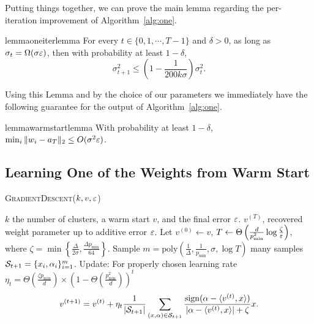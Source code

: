 Putting things together, we can prove the main lemma regarding the per-iteration improvement of Algorithm~\ref{alg:one}.

\begin{restatable}{lemma}{oneiterlemma} \label{lem:one_iter}
For every $t \in \{0, 1, \cdots, T - 1\}$ and $\delta > 0$, as long as $\sigma_t = \Omega ( \sigma \varepsilon)$, then with probability at least $1 - \delta$,
$$
\sigma_{t + 1}^2 \leq \left(1 - \frac{1}{200 k \sigma} \right) \sigma_t^2.
$$
\end{restatable}


Using this Lemma and by the choice of our parameters we immediately have the following guarantee for the output of Algorithm~\ref{alg:one}.

\begin{restatable}{lemma}{warmstartlemma}\label{lem:warmstart}
With probability at least $1-\delta$, $\min_i \|w_i - a_T\|_2 \le O(\sigma^2\varepsilon)$.
\end{restatable}




\subsection{Learning One of the Weights from Warm Start}\label{sec:gd}


\begin{algorithm}[!h]
\caption{ \textsc{GradientDescent}($k , v, \varepsilon$) \label{alg:gd}}
\begin{algorithmic}[1]
\REQUIRE $k$ the number of clusters, a warm start $v$, and the final error $\varepsilon$. 
\ENSURE $v^{(T)}$, recovered weight parameter up to additive error $\varepsilon$.
\STATE Let $v^{(0)} \leftarrow v$, $T \leftarrow \Theta\left(\frac{d}{p_{\min}^2} \log \frac{\zeta}{\varepsilon}\right)$, where $\zeta= \min\left\{\frac{\Delta}{2\sigma}, \frac{\Delta p_{\min}}{64 } \right\}$.
\STATE Sample $m  = \text{poly}\left( \frac{1}{\Delta}, \frac{1}{p_{\min}}, \sigma, \log T\right)$ many samples $\mathcal{S}_{t + 1} = \{ x_i, \alpha_i \}_{i = 1}^m$.
\STATE Update: For properly chosen learning rate $\eta_t = \Theta\left( \frac{\zeta p_{\min}}{d} \right) \times \left(1 - \Theta\left(\frac{p_{\min}^2}{d} \right)\right)^t$ \begin{align}
 v^{(t + 1)} = v^{(t)} + \eta_t \frac{1}{|\mathcal{S}_{t+1}|}\sum_{(x,\alpha) \in \mathcal{S}_{t+1}} \frac{\operatorname*{sign}(\alpha - \langle v^{(t)}, x \rangle)}{|\alpha - \langle v^{(t)}, x \rangle| + \zeta} x .
\end{align}
\ENDFOR
\end{algorithmic}
\end{algorithm}


